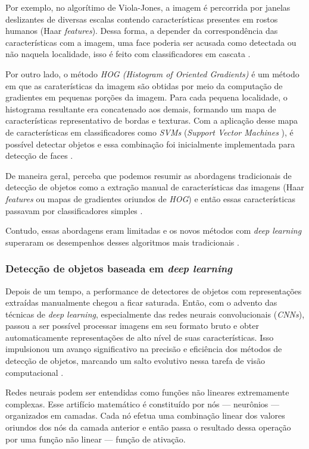 Por exemplo, no algorítimo de Viola-Jones, a imagem é percorrida por janelas deslizantes de diversas escalas contendo características presentes em rostos humanos (Haar \emph{features}). Dessa forma, a depender da correspondência das características com a imagem, uma face poderia ser acusada como detectada ou não naquela localidade, isso é feito com classificadores em cascata \citep{Viola}.

Por outro lado, o método \emph{HOG (Histogram of Oriented Gradients)} é um método em que as caraterísticas da imagem são obtidas por meio da computação de gradientes em pequenas porções da imagem. Para cada pequena localidade, o histograma resultante era concatenado aos demais, formando um mapa de características representativo de bordas e texturas. Com a aplicação desse mapa de características em classificadores como \emph{SVMs} (\emph{Support Vector Machines} \citep{Cortes1995Support-Vector}), é possível detectar objetos e essa combinação foi inicialmente implementada para detecção de faces \citep{HOG}.

De maneira geral, perceba que podemos resumir as abordagens tradicionais de detecção de objetos como a extração manual de características das imagens (Haar \emph{features} ou mapas de gradientes oriundos de \emph{HOG}) e então essas características passavam por classificadores simples \citep{Viola, HOG}.

Contudo, essas abordagens eram limitadas e os novos métodos com \emph{deep learning} superaram os desempenhos desses algoritmos mais tradicionais \citep{Zou2019Object}.

\subsubsection{Detecção de objetos baseada em \emph{deep learning}}
Depois de um tempo, a performance de detectores de objetos com representações extraídas manualmente chegou a ficar saturada. Então, com o advento das técnicas de \emph{deep learning}, especialmente das redes neurais convolucionais (\emph{CNNs}), passou a ser possível processar imagens em seu formato bruto e obter automaticamente representações de alto nível de suas características. Isso impulsionou um avanço significativo na precisão e eficiência dos métodos de detecção de objetos, marcando um salto evolutivo nessa tarefa de visão computacional \citep{Zou2019Object}.

Redes neurais podem ser entendidas como funções não lineares extremamente complexas. Esse artifício matemático é constituído por nós --- neurônios --- organizados em camadas. Cada nó efetua uma combinação linear dos valores oriundos dos nós da camada anterior e então passa o resultado dessa operação por uma função não linear --- função de ativação. 


